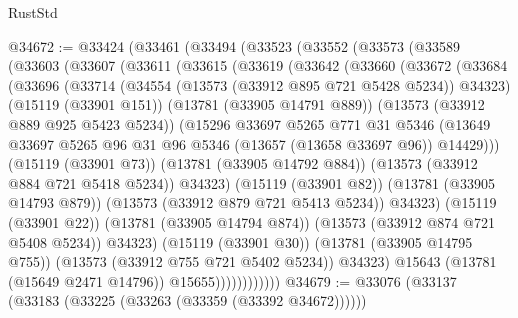 \begin{lexlean}{RustStd}
\begin{coremodule}
@34672 := @33424
    (@33461
      (@33494
        (@33523
          (@33552
            (@33573
              (@33589
                (@33603
                  (@33607
                    (@33611
                      (@33615
                        (@33619
                          (@33642
                            (@33660
                              (@33672
                                (@33684
                                  (@33696
                                    (@33714
                                      (@34554 (@13573 (@33912 @895 @721 @5428 @5234)) @34323)
                                      (@15119 (@33901 @151))
                                      (@13781 (@33905 @14791 @889))
                                      (@13573 (@33912 @889 @925 @5423 @5234))
                                      (@15296
                                        @33697
                                        @5265
                                        @771
                                        @31
                                        @5346
                                        (@13649
                                          @33697
                                          @5265
                                          @96
                                          @31
                                          @96
                                          @5346
                                          (@13657 (@13658 @33697 @96))
                                          @14429)))
                                    (@15119 (@33901 @73))
                                    (@13781 (@33905 @14792 @884))
                                    (@13573 (@33912 @884 @721 @5418 @5234))
                                    @34323)
                                  (@15119 (@33901 @82))
                                  (@13781 (@33905 @14793 @879))
                                  (@13573 (@33912 @879 @721 @5413 @5234))
                                  @34323)
                                (@15119 (@33901 @22))
                                (@13781 (@33905 @14794 @874))
                                (@13573 (@33912 @874 @721 @5408 @5234))
                                @34323)
                              (@15119 (@33901 @30))
                              (@13781 (@33905 @14795 @755))
                              (@13573 (@33912 @755 @721 @5402 @5234))
                              @34323)
                            @15643
                            (@13781 (@15649 @2471 @14796))
                            @15655))))))))))))
@34679 := @33076 (@33137 (@33183 (@33225 (@33263 (@33359 (@33392 @34672))))))

\end{coremodule}
\end{lexlean}
